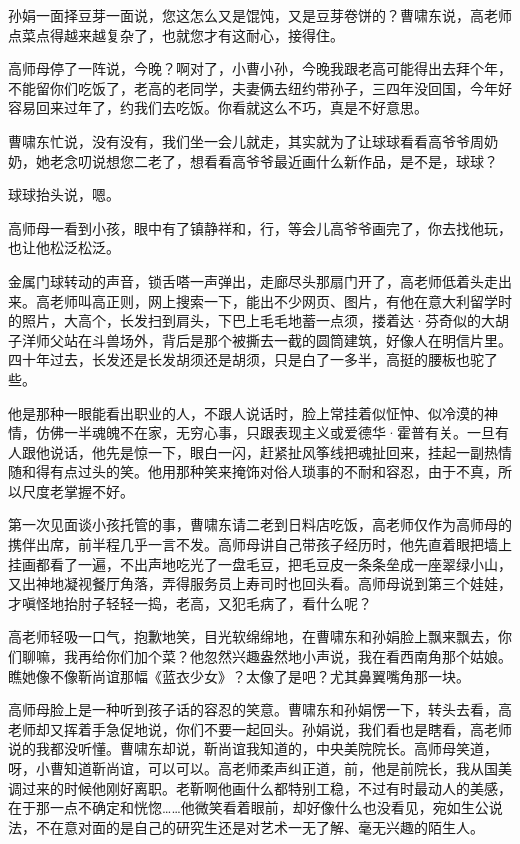 \documentclass[lang=cn,newtx,12pt,scheme=chinese]{elegantbook}
\begin{document}
孙娟一面择豆芽一面说，您这怎么又是馄饨，又是豆芽卷饼的？曹啸东说，高老师点菜点得越来越复杂了，也就您才有这耐心，接得住。

高师母停了一阵说，今晚？啊对了，小曹小孙，今晚我跟老高可能得出去拜个年，不能留你们吃饭了，老高的老同学，夫妻俩去纽约带孙子，三四年没回国，今年好容易回来过年了，约我们去吃饭。你看就这么不巧，真是不好意思。

曹啸东忙说，没有没有，我们坐一会儿就走，其实就为了让球球看看高爷爷周奶奶，她老念叨说想您二老了，想看看高爷爷最近画什么新作品，是不是，球球？

球球抬头说，嗯。

高师母一看到小孩，眼中有了镇静祥和，行，等会儿高爷爷画完了，你去找他玩，也让他松泛松泛。

金属门球转动的声音，锁舌嗒一声弹出，走廊尽头那扇门开了，高老师低着头走出来。高老师叫高正则，网上搜索一下，能出不少网页、图片，有他在意大利留学时的照片，大高个，长发扫到肩头，下巴上毛毛地蓄一点须，搂着达·芬奇似的大胡子洋师父站在斗兽场外，背后是那个被撕去一截的圆筒建筑，好像人在明信片里。四十年过去，长发还是长发胡须还是胡须，只是白了一多半，高挺的腰板也驼了些。

他是那种一眼能看出职业的人，不跟人说话时，脸上常挂着似怔忡、似冷漠的神情，仿佛一半魂魄不在家，无穷心事，只跟表现主义或爱德华·霍普有关。一旦有人跟他说话，他先是惊一下，眼白一闪，赶紧扯风筝线把魂扯回来，挂起一副热情随和得有点过头的笑。他用那种笑来掩饰对俗人琐事的不耐和容忍，由于不真，所以尺度老掌握不好。

第一次见面谈小孩托管的事，曹啸东请二老到日料店吃饭，高老师仅作为高师母的携伴出席，前半程几乎一言不发。高师母讲自己带孩子经历时，他先直着眼把墙上挂画都看了一遍，不出声地吃光了一盘毛豆，把毛豆皮一条条垒成一座翠绿小山，又出神地凝视餐厅角落，弄得服务员上寿司时也回头看。高师母说到第三个娃娃，才嗔怪地抬肘子轻轻一捣，老高，又犯毛病了，看什么呢？

高老师轻吸一口气，抱歉地笑，目光软绵绵地，在曹啸东和孙娟脸上飘来飘去，你们聊嘛，我再给你们加个菜？他忽然兴趣盎然地小声说，我在看西南角那个姑娘。瞧她像不像靳尚谊那幅《蓝衣少女》？太像了是吧？尤其鼻翼嘴角那一块。

高师母脸上是一种听到孩子话的容忍的笑意。曹啸东和孙娟愣一下，转头去看，高老师却又挥着手急促地说，你们不要一起回头。孙娟说，我们看也是瞎看，高老师说的我都没听懂。曹啸东却说，靳尚谊我知道的，中央美院院长。高师母笑道，呀，小曹知道靳尚谊，可以可以。高老师柔声纠正道，前，他是前院长，我从国美调过来的时候他刚好离职。老靳啊他画什么都特别工稳，不过有时最动人的美感，在于那一点不确定和恍惚……他微笑看着眼前，却好像什么也没看见，宛如生公说法，不在意对面的是自己的研究生还是对艺术一无了解、毫无兴趣的陌生人。
\end{document}
